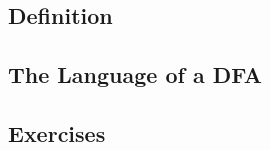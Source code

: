 

\subsection{Definition}

\subsection{The Language of a DFA}

\subsection{Exercises}\label{dfa-exer}


